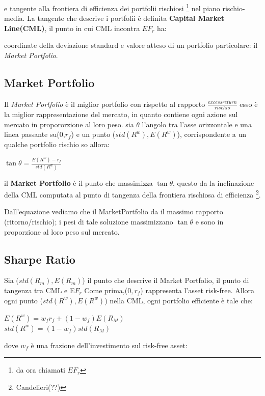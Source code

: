 \documentclass[a4paper,11pt]{report}
\begin{document}
{	e tangente alla frontiera di efficienza dei portfolii rischiosi \footnote{ da ora chiamati $EF_r$} nel piano rischio-media. \newline
	La tangente che descrive i portfolii è definita \textbf{Capital Market Line(CML)}, il punto in cui CML  incontra $EF_r$ ha:

	coordinate della deviazione standard e valore atteso di un portfolio particolare: il \emph{Market Portfolio}.
\subsection{Market Portfolio}	
	Il \emph{Market Portfolio} è il miglior portfolio con rispetto al rapporto ${\frac{excess return}{rischio}}$ \newline
	esso è la miglior rappresentazione del mercato, in quanto contiene ogni azione sul mercato in propororzione al loro peso. \newline
	sia $\theta$ l'angolo tra l'asse orizzontale e una linea passante su(0,$r_f$) e un punto ($std(R^w),E(R^w)$), corrispondente    	 a un qualche portfolio rischio so allora:
\begin{center}
 $\tan{\theta} = {\frac {E(R^w) - r_f}{std(R^w)}} $
\end{center} 
	il \textbf{Market Portfolio} è il punto che massimizza $\tan{\theta}$, questo da la inclinazione della CML computata al punto di tangenza della frontiera rischiosa di efficienza  \footnote{Candelieri(??)}.

	Dall'equazione vediamo che il MarketPortfolio da il massimo rapporto (ritorno/rischio); i pesi di tale soluzione massimizzano 
	$\tan\theta$ e sono in proporzione al loro peso sul mercato.

\newpage
\subsection{Sharpe Ratio}
	Sia ($std(R_m), E(R_m)$) il punto che descrive il Market Portfolio, il punto di tangenza tra CML e E$F_r$ \newline
	Come prima,($0,r_f$) rappresenta l'asset risk-free. Allora ogni punto ($std(R^w),E(R^w)$) nella CML, ogni portfolio efficiente è tale che: 
\begin{center}
	$E(R^w)= w_f r_f + (1-w_f)E(R_M) $ \\
	$std(R^w)=(1-w_f)std(R_M) $ \\
\end{center}
	dove $w_f$ è una frazione dell'investimento sul risk-free asset: 

}
\end{document}
